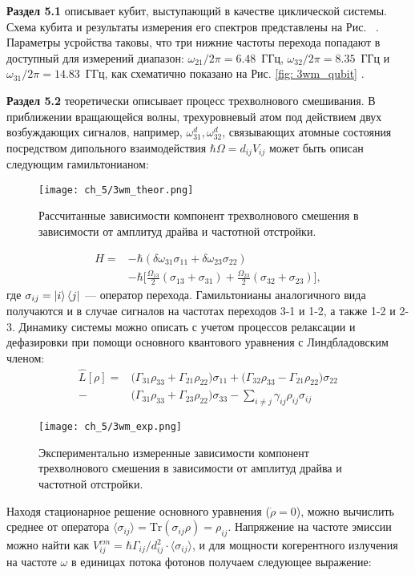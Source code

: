\textbf{Раздел 5.1} описывает кубит, выступающий в качестве циклической системы. Схема кубита и результаты измерения его спектров представлены на Рис. \ . Параметры усройства таковы, что три нижние частоты перехода попадают в доступный для измерений диапазон: $\omega_{21}/2\pi = 6.48$~ГГц, $\omega_{32}/2\pi = 8.35$~ГГц и $\omega_{31}/2\pi = 14.83$~ГГц, как схематично показано на Рис. \ref{fig: 3wm_qubit} . 

\textbf{Раздел 5.2} теоретически описывает процесс трехволнового смешивания. В приближении вращающейся волны, трехуровневый атом под действием двух возбуждающих сигналов, например, $\omega^d_{31}, \omega^d_{32} $, связывающих атомные состояния посредством дипольного взаимодействия $\hbar\Omega = d_{ij}V_{ij}$ может быть описан следующим гамильтонианом:
\begin{figure}[htb]\center
	\texttt{[image: ch\_5/3wm\_theor.png]}
	\caption{Рассчитанные зависимости компонент трехволнового смешения в зависимости от амплитуд драйва и частотной отстройки.}
	\label{fig: 3wm_theor}	
\end{figure}
\begin{equation}
\begin{split}
H = & -\hbar (\delta\omega_{31}\sigma_{11} + \delta\omega_{23}\sigma_{22}) \\
    & -\hbar\Big[\frac{\Omega_{13}}{2}(\sigma_{13}+\sigma_{31})+\frac{\Omega_{23}}{2}(\sigma_{32}+\sigma_{23})\Big],
\end{split}
\end{equation}
где $\sigma_{ij} = \ket{i}\bra{j}$ --- оператор перехода. Гамильтонианы аналогичного вида получаются и в случае сигналов на частотах переходов 3-1 и 1-2, а также 1-2 и 2-3. Динамику системы можно описать с учетом процессов релаксации и дефазировки при помощи основного квантового уравнения с Линдбладовским членом:
\begin{equation}
\begin{split}
\hat{L}[\rho] = & \big(\Gamma_{31}\rho_{33} + \Gamma_{21}\rho_{22}\big)\sigma_{11} 
+ \big(\Gamma_{32}\rho_{33} - \Gamma_{21}\rho_{22}\big)\sigma_{22} \\
- &\big(\Gamma_{31}\rho_{33} + \Gamma_{23}\rho_{22}\big)\sigma_{33} 
- \sum_{i\ne j}\gamma_{ij}\rho_{ij}\sigma_{ij}
\end{split}
\end{equation}

\begin{figure}[h]\center
	\texttt{[image: ch\_5/3wm\_exp.png]}
	\caption{Экспериментально измеренные зависимости компонент трехволнового смешения в зависимости от амплитуд драйва и частотной отстройки. }
	\label{fig: 3wm_exp}	
\end{figure}
Находя стационарное решение основного уравнения ($\dot{\rho}=0$), можно вычислить среднее от оператора $\langle\sigma_{ij}\rangle=\text{Tr}(\sigma_{ij}\rho)=\rho_{ij}$. Напряжение на частоте эмиссии можно найти как $V_{ij}^{em} = \hbar\Gamma_{ij}/d_{ij}^2 \cdot \langle\sigma_{ij}\rangle$, и для мощности когерентного излучения на частоте $\omega$ в единицах потока фотонов получаем следующее выражение:


